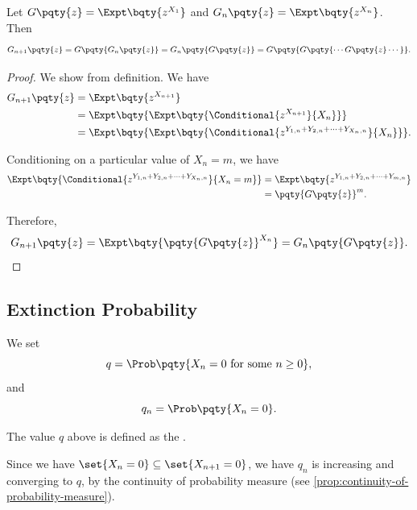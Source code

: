 \begin{theorem}
    \label{thm:branching-processes-pgf}%
    Let \(G\pqty{z} = \Expt\bqty{z^{X_1}}\) and \(G_n\pqty{z} = \Expt\bqty{z^{X_n}}\). Then
    \[
        G_{n + 1} \pqty{z} = G\pqty{G_{n} \pqty{z}} = G_n\pqty{G\pqty{z}} = G\pqty{G\pqty{\cdots G\pqty{z} \cdots}}.
    \]  
\end{theorem}

\begin{proof}
    We show from definition. We have
    \begin{align*}
        G_{n + 1} \pqty{z} &= \Expt\bqty{z^{X_{n + 1}}} \\
        &= \Expt\bqty{\Expt\bqty{\Conditional{z^{X_{n + 1}}}{X_n}}} \\
        &= \Expt\bqty{\Expt\bqty{\Conditional{z^{Y_{1, n} + Y_{2, n} + \cdots + Y_{X_n, n}}}{X_n}}}.
    \end{align*}

    Conditioning on a particular value of \(X_n = m\), we have
    \begin{align*}
        \Expt\bqty{\Conditional{z^{Y_{1, n} + Y_{2, n} + \cdots + Y_{X_n, n}}}{X_n = m}} &= \Expt\bqty{z^{Y_{1, n} + Y_{2, n} + \cdots + Y_{m, n}}} \\
        &= \pqty{G\pqty{z}}^{m}.
    \end{align*}

    Therefore,
    \[
        G_{n + 1} \pqty{z} = \Expt\bqty{\pqty{G\pqty{z}}^{X_n}} = G_n \pqty{G\pqty{z}}.
    \]
\end{proof}

\subsection{Extinction Probability}

We set
\[
    q = \Prob\pqty{X_n = 0 \text{ for some } n \geq 0},
\]
and
\[
    q_n = \Prob\pqty{X_n = 0}.
\]

\begin{definition}
    \label{def:exctinction-probability}%
    The value \(q\) above is defined as the .
\end{definition}

Since we have \(\set{X_n = 0} \subseteq \set{X_{n + 1} = 0}\), we have \(q_n\) is increasing and converging to \(q\), by the continuity of probability measure (see \autoref{prop:continuity-of-probability-measure}).

